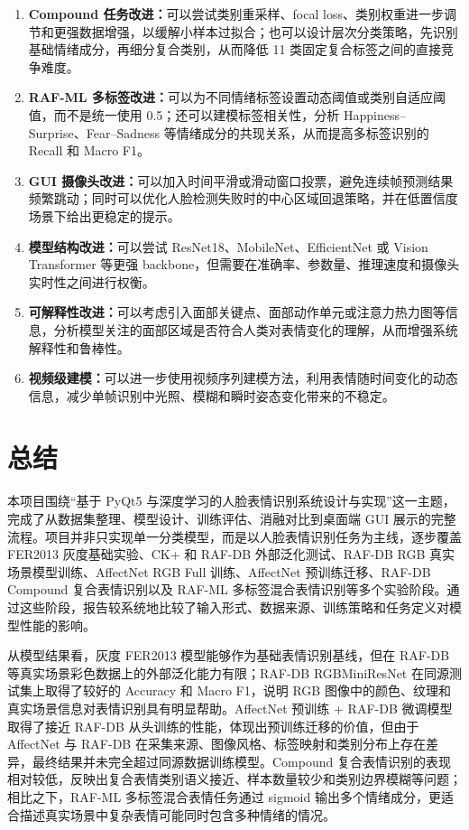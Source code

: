 \documentclass[UTF8,a4paper,12pt]{ctexart}
\begin{document}
\begin{enumerate}
  \item \textbf{Compound 任务改进：}可以尝试类别重采样、focal loss、类别权重进一步调节和更强数据增强，以缓解小样本过拟合；也可以设计层次分类策略，先识别基础情绪成分，再细分复合类别，从而降低 11 类固定复合标签之间的直接竞争难度。
  \item \textbf{RAF-ML 多标签改进：}可以为不同情绪标签设置动态阈值或类别自适应阈值，而不是统一使用 0.5；还可以建模标签相关性，分析 Happiness--Surprise、Fear--Sadness 等情绪成分的共现关系，从而提高多标签识别的 Recall 和 Macro F1。
  \item \textbf{GUI 摄像头改进：}可以加入时间平滑或滑动窗口投票，避免连续帧预测结果频繁跳动；同时可以优化人脸检测失败时的中心区域回退策略，并在低置信度场景下给出更稳定的提示。
  \item \textbf{模型结构改进：}可以尝试 ResNet18、MobileNet、EfficientNet 或 Vision Transformer 等更强 backbone，但需要在准确率、参数量、推理速度和摄像头实时性之间进行权衡。
  \item \textbf{可解释性改进：}可以考虑引入面部关键点、面部动作单元或注意力热力图等信息，分析模型关注的面部区域是否符合人类对表情变化的理解，从而增强系统解释性和鲁棒性。
  \item \textbf{视频级建模：}可以进一步使用视频序列建模方法，利用表情随时间变化的动态信息，减少单帧识别中光照、模糊和瞬时姿态变化带来的不稳定。
\end{enumerate}

\section{总结}

本项目围绕“基于 PyQt5 与深度学习的人脸表情识别系统设计与实现”这一主题，完成了从数据集整理、模型设计、训练评估、消融对比到桌面端 GUI 展示的完整流程。项目并非只实现单一分类模型，而是以人脸表情识别任务为主线，逐步覆盖 FER2013 灰度基础实验、CK+ 和 RAF-DB 外部泛化测试、RAF-DB RGB 真实场景模型训练、AffectNet RGB Full 训练、AffectNet 预训练迁移、RAF-DB Compound 复合表情识别以及 RAF-ML 多标签混合表情识别等多个实验阶段。通过这些阶段，报告较系统地比较了输入形式、数据来源、训练策略和任务定义对模型性能的影响。

从模型结果看，灰度 FER2013 模型能够作为基础表情识别基线，但在 RAF-DB 等真实场景彩色数据上的外部泛化能力有限；RAF-DB RGBMiniResNet 在同源测试集上取得了较好的 Accuracy 和 Macro F1，说明 RGB 图像中的颜色、纹理和真实场景信息对表情识别具有明显帮助。AffectNet 预训练 + RAF-DB 微调模型取得了接近 RAF-DB 从头训练的性能，体现出预训练迁移的价值，但由于 AffectNet 与 RAF-DB 在采集来源、图像风格、标签映射和类别分布上存在差异，最终结果并未完全超过同源数据训练模型。Compound 复合表情识别的表现相对较低，反映出复合表情类别语义接近、样本数量较少和类别边界模糊等问题；相比之下，RAF-ML 多标签混合表情任务通过 sigmoid 输出多个情绪成分，更适合描述真实场景中复杂表情可能同时包含多种情绪的情况。
\end{document}

